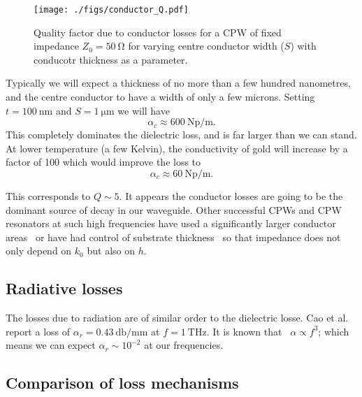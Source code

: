 \documentclass[a4paper]{article}
\begin{document}
\begin{figure}
  \texttt{[image: ./figs/conductor\_Q.pdf]}
  \caption{Quality factor due to conductor losses for a CPW of fixed impedance
  $Z_0=\SI{50}{\ohm}$ for varying centre conductor width ($S$) with conducotr
  thickness as a parameter.}
  \label{fig:conductorQ}
\end{figure}

Typically we will expect a thickness of no more than a few hundred nanometres,
and the centre conductor to have a width of only a few microns. Setting
$t=\SI{100}{\nano\metre}$ and $S=\SI{1}{\micro\metre}$ we will have
\begin{equation}
  \alpha_c \approx \SI{600}{\neper \per \meter}.
\end{equation}
This completely dominates the dielectric loss, and is far larger than we can
stand. At lower temperature (a few Kelvin), the conductivity of gold will
increase by a factor of 100 which would improve the loss to
\begin{equation}
  \alpha_c \approx \SI{60}{\neper \per \meter}.
\end{equation}

This corresponds to $Q\sim5$. It appears the conductor losses are going
to be the dominant source of decay in our waveguide. Other successful CPWs and
CPW resonators at such high frequencies have used a significantly larger
conductor areas~\cite{1127105, doi:10.1063/1.3010859} or have had control of
substrate thickness~\cite{L.Cao2013} so that impedance does not only depend on
$k_0$ but also on $h$.

\subsection{Radiative losses}

The losses due to radiation are of similar order to the dielectric losse. Cao et
al.~\cite{L.Cao2013} report a loss of $\alpha_r = \SI{0.43}{\decibel \per \milli
\meter}$ at $f=\SI{1}{\tera\hertz}$. It is known that~\cite{81658} $\alpha
\propto f^3$; which means we can expect $\alpha_r \sim 10^{-2}$ at our
frequencies.

\subsection{Comparison of loss mechanisms}
\end{document}
